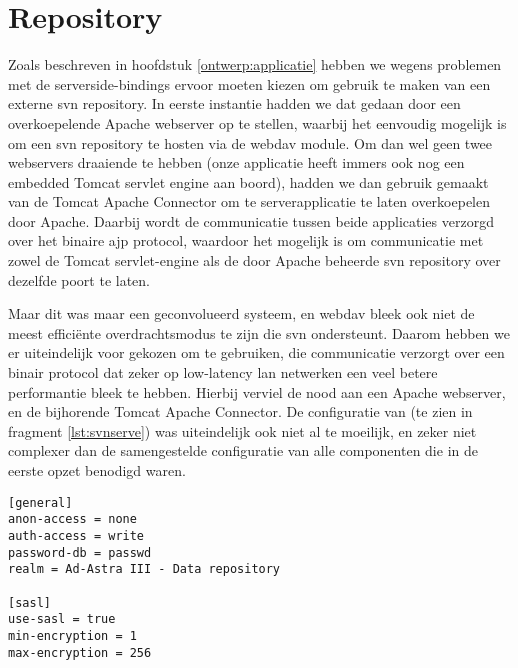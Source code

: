 \section{Repository}
\label{server:deployment:repository}

Zoals beschreven in hoofdstuk \ref{ontwerp:applicatie} hebben we wegens problemen met de serverside-bindings ervoor moeten kiezen om gebruik te maken van een externe \ac{svn} repository. In eerste instantie hadden we dat gedaan door een overkoepelende Apache webserver op te stellen, waarbij het eenvoudig mogelijk is om een \ac{svn} repository te hosten via de  \ac{webdav} module. Om dan wel geen twee webservers draaiende te hebben (onze applicatie heeft immers ook nog een embedded Tomcat servlet engine aan boord), hadden we dan gebruik gemaakt van de  Tomcat Apache Connector om te serverapplicatie te laten overkoepelen door Apache. Daarbij wordt de communicatie tussen beide applicaties verzorgd over het binaire \ac{ajp} protocol, waardoor het mogelijk is om communicatie met zowel de Tomcat servlet-engine als de door Apache beheerde \ac{svn} repository over dezelfde poort te laten.

Maar dit was maar een geconvolueerd systeem, en \ac{webdav} bleek ook niet de meest efficiënte overdrachtsmodus te zijn die \ac{svn} ondersteunt. Daarom hebben we er uiteindelijk voor gekozen om  te gebruiken, die communicatie verzorgt over een binair protocol dat zeker op low-latency \ac{lan} netwerken een veel betere performantie bleek te hebben. Hierbij verviel de nood aan een Apache webserver, en de bijhorende Tomcat Apache Connector. De configuratie van  (te zien in fragment \ref{lst:svnserve}) was uiteindelijk ook niet al te moeilijk, en zeker niet complexer dan de samengestelde configuratie van alle componenten die in de eerste opzet benodigd waren.

\begin{lstlisting}[float, caption=Configuratie van een door svnserve-beheerde \acs{svn} repository., label=lst:svnserve]
[general]
anon-access = none
auth-access = write
password-db = passwd
realm = Ad-Astra III - Data repository

[sasl]
use-sasl = true
min-encryption = 1
max-encryption = 256
\end{lstlisting}

